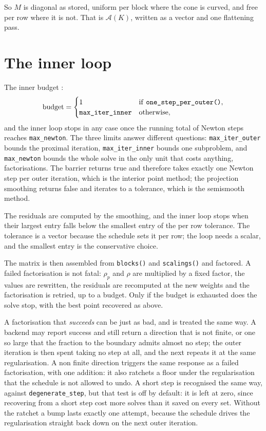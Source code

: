 \documentclass[a4paper,11pt]{book}
\theoremstyle{plain}
\theoremstyle{definition}
\theoremstyle{remark}
\numberwithin{equation}{chapter}
\numberwithin{algorithm}{chapter}
\begin{document}
	So $M$ is diagonal as stored, uniform per block where the cone is curved, and
	free per row where it is not. That is $\mathcal{A}(K)$, written as a vector
	and one flattening pass.

	\section{The inner loop}

	The inner budget :
	\begin{equation}
		\text{budget}=
		\begin{cases}
			1 & \text{if \texttt{one\_step\_per\_outer()}},\\
			\texttt{max\_iter\_inner} & \text{otherwise},
		\end{cases}
	\end{equation}
	and the inner loop stops in any case once the running total of Newton steps
	reaches \texttt{max\_newton}. The three limits answer different questions:
	\texttt{max\_iter\_outer} bounds the proximal iteration,
	\texttt{max\_iter\_inner} bounds one subproblem, and \texttt{max\_newton}
	bounds the whole solve in the only unit that costs anything, factorisations.
	The barrier returns true and therefore takes exactly one Newton step per
	outer iteration, which is the interior point method; the projection smoothing
	returns false and iterates to a tolerance, which is the semismooth method.

	The residuals are computed by the smoothing, and the inner loop stops when
	their largest entry falls below the smallest entry of the per row tolerance.
	The tolerance is a vector because the schedule sets it per row; the loop needs
	a scalar, and the smallest entry is the conservative choice.

	The matrix is then assembled from \texttt{blocks()} and \texttt{scalings()}
	and factored. A failed factorisation is not fatal: $\rho_p$ and $\rho$ are
	multiplied by a fixed factor, the values are rewritten, the residuals are
	recomputed at the new weights and the factorisation is retried, up to a
	budget. Only if the budget is exhausted does the solve stop, with the best
	point recovered as above.

	A factorisation that \emph{succeeds} can be just as bad, and is treated the
	same way. A backend may report success and still return a direction that is
	not finite, or one so large that the fraction to the boundary admits almost no
	step; the outer iteration is then spent taking no step at all, and the next
	repeats it at the same regularisation. A non finite direction triggers the
	same response as a failed factorisation, with one addition: it also ratchets a
	floor under the regularisation that the schedule is not allowed to undo. A
	short step is recognised the same way, against \texttt{degenerate\_step},
	but that test is off by default: it is left at zero, since recovering from a
	short step cost more solves than it saved on every set. Without the ratchet a
	bump lasts exactly one attempt, because the schedule drives the regularisation
	straight back down on the next outer iteration. 
\end{document}
